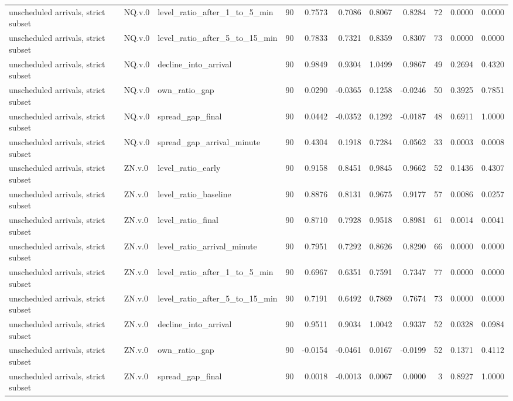 \begin{tabular}{lllrrrrrrrr}
unscheduled arrivals, strict subset & NQ.v.0 & level_ratio_after_1_to_5_min & 90 & 0.7573 & 0.7086 & 0.8067 & 0.8284 & 72 & 0.0000 & 0.0000 \\
unscheduled arrivals, strict subset & NQ.v.0 & level_ratio_after_5_to_15_min & 90 & 0.7833 & 0.7321 & 0.8359 & 0.8307 & 73 & 0.0000 & 0.0000 \\
unscheduled arrivals, strict subset & NQ.v.0 & decline_into_arrival & 90 & 0.9849 & 0.9304 & 1.0499 & 0.9867 & 49 & 0.2694 & 0.4320 \\
unscheduled arrivals, strict subset & NQ.v.0 & own_ratio_gap & 90 & 0.0290 & -0.0365 & 0.1258 & -0.0246 & 50 & 0.3925 & 0.7851 \\
unscheduled arrivals, strict subset & NQ.v.0 & spread_gap_final & 90 & 0.0442 & -0.0352 & 0.1292 & -0.0187 & 48 & 0.6911 & 1.0000 \\
unscheduled arrivals, strict subset & NQ.v.0 & spread_gap_arrival_minute & 90 & 0.4304 & 0.1918 & 0.7284 & 0.0562 & 33 & 0.0003 & 0.0008 \\
unscheduled arrivals, strict subset & ZN.v.0 & level_ratio_early & 90 & 0.9158 & 0.8451 & 0.9845 & 0.9662 & 52 & 0.1436 & 0.4307 \\
unscheduled arrivals, strict subset & ZN.v.0 & level_ratio_baseline & 90 & 0.8876 & 0.8131 & 0.9675 & 0.9177 & 57 & 0.0086 & 0.0257 \\
unscheduled arrivals, strict subset & ZN.v.0 & level_ratio_final & 90 & 0.8710 & 0.7928 & 0.9518 & 0.8981 & 61 & 0.0014 & 0.0041 \\
unscheduled arrivals, strict subset & ZN.v.0 & level_ratio_arrival_minute & 90 & 0.7951 & 0.7292 & 0.8626 & 0.8290 & 66 & 0.0000 & 0.0000 \\
unscheduled arrivals, strict subset & ZN.v.0 & level_ratio_after_1_to_5_min & 90 & 0.6967 & 0.6351 & 0.7591 & 0.7347 & 77 & 0.0000 & 0.0000 \\
unscheduled arrivals, strict subset & ZN.v.0 & level_ratio_after_5_to_15_min & 90 & 0.7191 & 0.6492 & 0.7869 & 0.7674 & 73 & 0.0000 & 0.0000 \\
unscheduled arrivals, strict subset & ZN.v.0 & decline_into_arrival & 90 & 0.9511 & 0.9034 & 1.0042 & 0.9337 & 52 & 0.0328 & 0.0984 \\
unscheduled arrivals, strict subset & ZN.v.0 & own_ratio_gap & 90 & -0.0154 & -0.0461 & 0.0167 & -0.0199 & 52 & 0.1371 & 0.4112 \\
unscheduled arrivals, strict subset & ZN.v.0 & spread_gap_final & 90 & 0.0018 & -0.0013 & 0.0067 & 0.0000 & 3 & 0.8927 & 1.0000 \\

\end{tabular}
